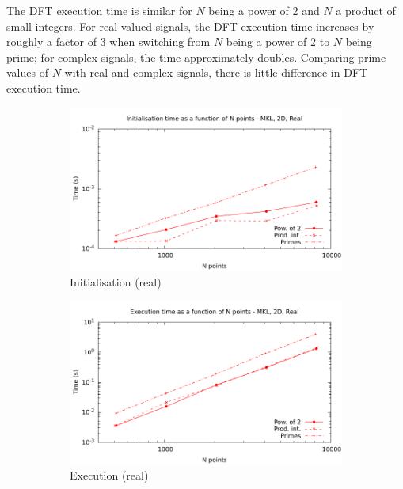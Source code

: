 \documentclass[12pt, a4paper]{article} \setlength{\textheight}{24cm}
\begin{document}
The DFT execution time is similar for $N$ being a power of 2 and $N$ a
product of small integers. For real-valued signals, the DFT execution
time increases by roughly a factor of 3 when switching from $N$ being
a power of 2 to $N$ being prime; for complex signals, the time
approximately doubles. Comparing prime values of $N$ with real and
complex signals, there is little difference in DFT execution time.

\begin{figure}[H]
  \captionsetup{width=0.8\linewidth}
  \centering
  \begin{subfigure}{.5\textwidth}
    \centering
    \includegraphics[width=.9\linewidth]{graphs/2d-mkl-init-r.pdf}
    \caption{Initialisation (real)}
    \label{2DMKLRI}
  \end{subfigure}%
  \begin{subfigure}{.5\textwidth}
    \centering
    \includegraphics[width=.9\linewidth]{graphs/2d-mkl-exec-r.pdf}
    \caption{Execution (real)}
    \label{2DMKLR}
  \end{subfigure}\\
  \begin{subfigure}{.5\textwidth}
    \centering

\end{subfigure}
\end{figure}
\end{document}
